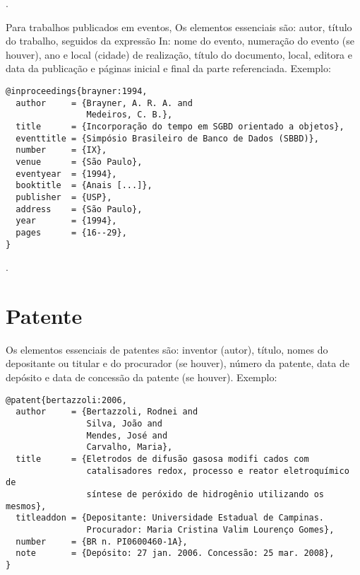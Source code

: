 \noindent
{}.

\vspace*{1em}

Para trabalhos publicados em eventos, Os elementos essenciais são: autor, título do trabalho, seguidos da expressão In: nome do evento, numeração do evento (se houver), ano e local (cidade) de realização, título do documento, local, editora e data da publicação e páginas inicial e final da parte referenciada.
Exemplo:

\vspace*{1em}

\begin{Verbatim}[frame=single]
@inproceedings{brayner:1994,
  author     = {Brayner, A. R. A. and
                Medeiros, C. B.},
  title      = {Incorporação do tempo em SGBD orientado a objetos},
  eventtitle = {Simpósio Brasileiro de Banco de Dados (SBBD)},
  number     = {IX},
  venue      = {São Paulo},
  eventyear  = {1994},
  booktitle  = {Anais [...]},
  publisher  = {USP},
  address    = {São Paulo},
  year       = {1994},
  pages      = {16--29},
}
\end{Verbatim}

\noindent
{}.

\section{Patente}

Os elementos essenciais de patentes são: inventor (autor), título, nomes do depositante ou titular e do procurador (se houver), número da patente, data de depósito e data de concessão da patente (se houver).
Exemplo:

\vspace*{1em}

\begin{Verbatim}[frame=single]
@patent{bertazzoli:2006,
  author     = {Bertazzoli, Rodnei and
                Silva, João and
                Mendes, José and
                Carvalho, Maria},
  title      = {Eletrodos de difusão gasosa modifi cados com
                catalisadores redox, processo e reator eletroquímico de
                síntese de peróxido de hidrogênio utilizando os mesmos},
  titleaddon = {Depositante: Universidade Estadual de Campinas.
                Procurador: Maria Cristina Valim Lourenço Gomes},
  number     = {BR n. PI0600460-1A},
  note       = {Depósito: 27 jan. 2006. Concessão: 25 mar. 2008},
}
\end{Verbatim}


